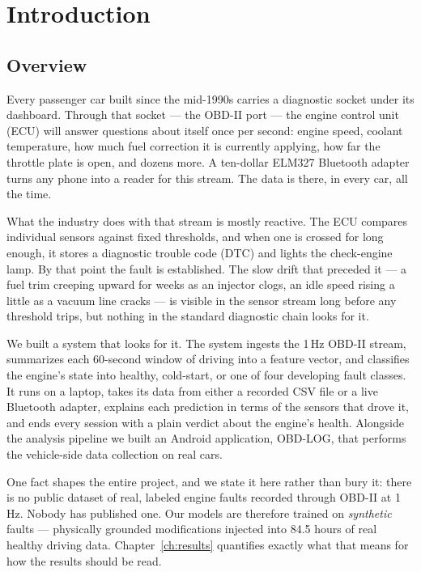 \section{Introduction}
\label{ch:intro}

\subsection{Overview}

Every passenger car built since the mid-1990s carries a diagnostic socket
under its dashboard. Through that socket --- the OBD-II port --- the engine
control unit (ECU) will answer questions about itself once per second:
engine speed, coolant temperature, how much fuel correction it is currently
applying, how far the throttle plate is open, and dozens more. A ten-dollar
ELM327 Bluetooth adapter turns any phone into a reader for this stream.
The data is there, in every car, all the time.

What the industry does with that stream is mostly reactive. The ECU compares
individual sensors against fixed thresholds, and when one is crossed for long
enough, it stores a diagnostic trouble code (DTC) and lights the check-engine
lamp. By that point the fault is established. The slow drift that preceded it
--- a fuel trim creeping upward for weeks as an injector clogs, an idle speed
rising a little as a vacuum line cracks --- is visible in the sensor stream
long before any threshold trips, but nothing in the standard diagnostic chain
looks for it.

We built a system that looks for it. The system ingests the 1\,Hz OBD-II
stream, summarizes each 60-second window of driving into a feature vector,
and classifies the engine's state into healthy, cold-start, or one of four
developing fault classes. It runs on a laptop, takes its data from either a
recorded CSV file or a live Bluetooth adapter, explains each prediction in
terms of the sensors that drove it, and ends every session with a plain
verdict about the engine's health. Alongside the analysis pipeline we built
an Android application, OBD-LOG, that performs the vehicle-side data
collection on real cars.

One fact shapes the entire project, and we state it here rather than bury it:
there is no public dataset of real, labeled engine faults recorded through
OBD-II at 1\,Hz. Nobody has published one. Our models are therefore trained
on \emph{synthetic} faults --- physically grounded modifications injected
into 84.5 hours of real healthy driving data. Chapter~\ref{ch:results}
quantifies exactly what that means for how the results should be read.

